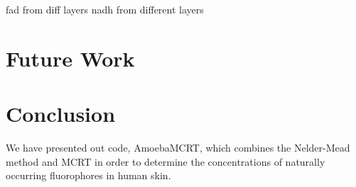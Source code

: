 fad from diff layers
nadh from different layers


\section{Future Work}

\section{Conclusion}

We have presented out code, AmoebaMCRT, which combines the Nelder-Mead method and MCRT in order to determine the concentrations of naturally occurring fluorophores in human skin.



